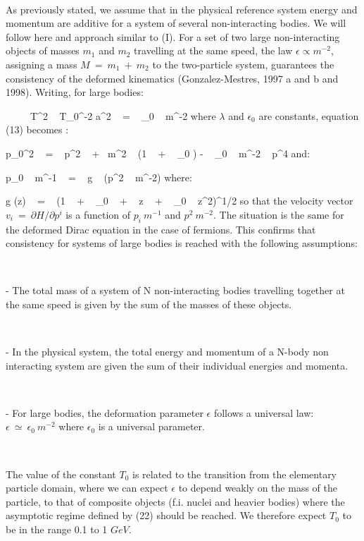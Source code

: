 \documentclass[a4paper,12pt,dvips]{article}
\begin{document}
~

As previously stated, we assume that in the physical reference system energy and momentum are additive for a system of several non-interacting bodies. We will follow here and approach similar to (I). For a set of two large non-interacting objects of masses $m_1$ and $m_2$ travelling at the same speed, the law $\epsilon \propto m^{-2}$, assigning a mass $M ~ = ~ m_1 ~ + ~ m_2$ to the two-particle system, guarantees the consistency of the deformed kinematics (Gonzalez-Mestres, 1997 a and b and 1998). Writing, for large bodies:

\equation
\epsilon ~ \simeq ~ \lambda ~ T^2 ~ T_0^{-2} a^2 ~ = ~ \epsilon _0 ~ m^{-2}
\endequation
\noindent
where $\lambda $ and $\epsilon _0 $ are constants, equation (13) becomes : 

\equation
p_{0}^2 ~ = ~ p^2 ~ + ~m^2 ~ (1 ~ + ~ \epsilon _0 ) - ~ \epsilon _0 ~ m^{-2} ~ p^4
\endequation
\noindent
and:

\equation
p_0 ~ m^{-1} ~ = ~ g ~ (p^2 ~ m^{-2})
\endequation
\noindent
where:

\equation
g (z) ~ = ~ (1 ~ + ~ \epsilon _0 ~ + ~ z ~ + ~ \epsilon _0 ~ z^2)^{1/2}
\endequation
\noindent
so that the velocity vector $v_i ~ = ~ \partial H/\partial p^i $ is a function of $p_i ~ m^{-1}$ and $p^2 ~ m^{-2}$. The situation is the same for the deformed Dirac equation in the case of fermions. This confirms that consistency for systems of large bodies is reached with the following assumptions:

~ 

- The total mass of a system of N non-interacting bodies travelling together at the same speed is given by the sum of the masses of these objects.

~ 

- In the physical system, the total energy and momentum of a N-body non interacting system are given the sum of their individual energies and momenta.

~ 

- For large bodies, the deformation parameter $\epsilon $ follows a universal law: $\epsilon ~ \simeq ~ \epsilon _0 ~ m^{-2}$ where $ \epsilon _0 $ is a universal parameter.

~

The value of the constant $T_0$ is related to the transition from the elementary particle domain, where we can expect $\epsilon $ to depend weakly on the mass of the particle, to that of composite objects (f.i. nuclei and heavier bodies) where the asymptotic regime defined by (22) should be reached. We therefore expect $T_0$ to be in the range 0.1 to 1 $GeV$.
\end{document}
